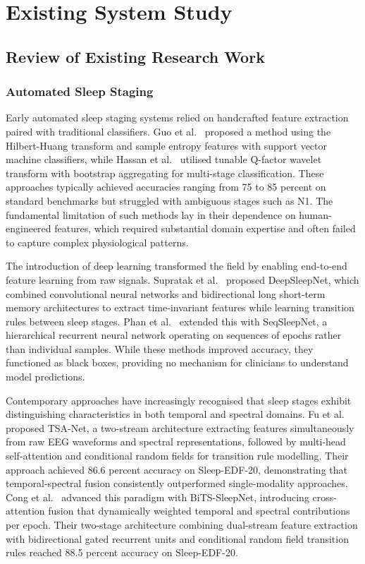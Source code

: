 
\section{Existing System Study}

\subsection{Review of Existing Research Work}

\subsubsection{Automated Sleep Staging}

Early automated sleep staging systems relied on handcrafted feature extraction paired with traditional classifiers. Guo et al.\ \cite{guo2017hilbert} proposed a method using the Hilbert-Huang transform and sample entropy features with support vector machine classifiers, while Hassan et al.\ \cite{hassan2017decision} utilised tunable Q-factor wavelet transform with bootstrap aggregating for multi-stage classification. These approaches typically achieved accuracies ranging from 75 to 85 percent on standard benchmarks but struggled with ambiguous stages such as N1. The fundamental limitation of such methods lay in their dependence on human-engineered features, which required substantial domain expertise and often failed to capture complex physiological patterns.

The introduction of deep learning transformed the field by enabling end-to-end feature learning from raw signals. Supratak et al.\ \cite{supratak2017deepsleepnet} proposed DeepSleepNet, which combined convolutional neural networks and bidirectional long short-term memory architectures to extract time-invariant features while learning transition rules between sleep stages. Phan et al.\ \cite{phan2018deepsleepnet} extended this with SeqSleepNet, a hierarchical recurrent neural network operating on sequences of epochs rather than individual samples. While these methods improved accuracy, they functioned as black boxes, providing no mechanism for clinicians to understand model predictions.

Contemporary approaches have increasingly recognised that sleep stages exhibit distinguishing characteristics in both temporal and spectral domains. Fu et al.\ \cite{fu2023tsanet} proposed TSA-Net, a two-stream architecture extracting features simultaneously from raw EEG waveforms and spectral representations, followed by multi-head self-attention and conditional random fields for transition rule modelling. Their approach achieved 86.6 percent accuracy on Sleep-EDF-20, demonstrating that temporal-spectral fusion consistently outperformed single-modality approaches. Cong et al.\ \cite{cong2025bits} advanced this paradigm with BiTS-SleepNet, introducing cross-attention fusion that dynamically weighted temporal and spectral contributions per epoch. Their two-stage architecture combining dual-stream feature extraction with bidirectional gated recurrent units and conditional random field transition rules reached 88.5 percent accuracy on Sleep-EDF-20.

